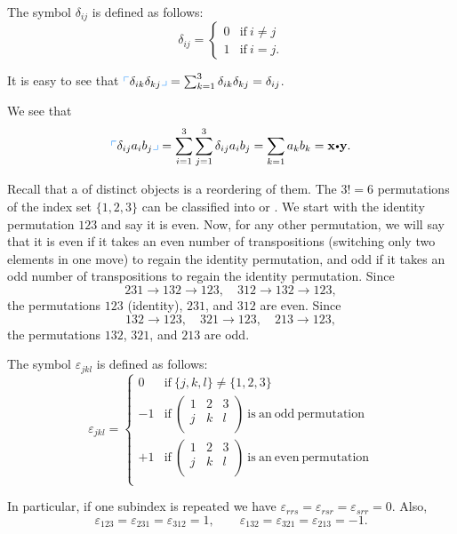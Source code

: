 \begin{df} The symbol $\delta
_{ij}$ is defined as follows:
$$ \delta _{ij} = \left\{ \begin{array}{ll} 0 & \mathrm{if}\ i\neq j \\
1 & \mathrm{if}\ i = j.
\end{array}
\right.
$$
\end{df}
\begin{exa}
It is easy to see that $\es{\delta _{ik}\delta _{kj}} = \sum _{k=1}
^3 \delta _{ik}\delta _{kj}=\delta _{ij}$.
\end{exa}
\begin{exa}
We see that $$\es{\delta _{ij}a_ib_j} = \sum _{i=1} ^3 \sum _{j=1}
^3\delta _{ij}a_ib_j = \sum _{k=1} a_kb_k = \dotprod{x}{y}.
$$
\end{exa}
Recall that a  of distinct objects is a reordering
of them. The $3!=6$ permutations of the index set  $\{1,2,3\}$ can
be classified into  or . We start with the
identity permutation $123$ and say it is even. Now, for any other
permutation, we will say that it is even if it takes an even number
of transpositions (switching only two elements in one move) to
regain the identity permutation, and odd if it takes an odd number
of transpositions to regain the identity permutation. Since
$$ 231 \to 132 \to 123, \quad 312 \to 132 \to 123, $$the
permutations $123$ (identity), $231$, and $312$ are even. Since
$$ 132 \to 123, \quad  321 \to 123, \quad 213 \to 123, $$the
permutations $132$, $321$, and $213$ are odd.

\begin{df} The symbol $\varepsilon
_{jkl}$ is defined as follows:
$$ \varepsilon _{jkl} = \left\{ \begin{array}{ll} 0 & \mathrm{if}\ \{j,k,l\} \neq \{1,2,3\} \\
-1 & \mathrm{if}\ \begin{pmatrix} 1 & 2 & 3 \\ j & k & l \\
\end{pmatrix}\ \mathrm{is\ an \ odd\ permutation }\\
+1 & \mathrm{if}\ \begin{pmatrix} 1 & 2 & 3 \\ j & k & l \\
\end{pmatrix}\ \mathrm{is\ an \ even\ permutation }\\
\end{array}
\right.
$$
\end{df}
\begin{rem}
In particular, if one subindex is repeated we have $\varepsilon
_{rrs}=\varepsilon _{rsr}=\varepsilon _{srr}=0$. Also,
$$ \varepsilon
_{123}= \varepsilon _{231}=\varepsilon _{312}=1, \qquad  \varepsilon
_{132}= \varepsilon _{321}=\varepsilon _{213}=-1.$$

\end{rem}


